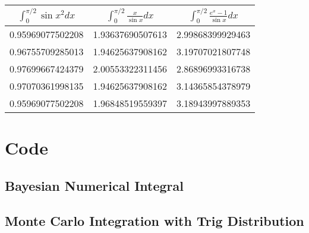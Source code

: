 \documentclass[a4paper12pt,titlepage]{article}
\begin{document}
        \begin{table}[h!]
          \begin{center}
            \label{tab:table1}
            \begin{tabular}{|c|c|c|}
              \toprule
              \large{\textbf{$\int_{0}^{\pi/2} \sin{x^2} dx$}} & \large{\textbf{$\int_{0}^{\pi/2} \frac{x}{\sin{x}} dx$}} & \large{\textbf{$\int_{0}^{\pi/2} \frac{e^x -1}{\sin{x}} dx$}}\\
              \hline
              \normalsize{0.95969077502208} &\normalsize{1.93637690507613} & \normalsize{2.99868399929463}\\
              \hline              
              \normalsize{0.96755709285013} &\normalsize{1.94625637908162} & \normalsize{3.19707021807748}\\
              \hline              
              \normalsize{0.97699667424379} &\normalsize{2.00553322311456} & \normalsize{2.86896993316738}\\
              \hline              
              \normalsize{0.97070361998135} &\normalsize{1.94625637908162} & \normalsize{3.14365854378979}\\
              \hline              
              \normalsize{0.95969077502208} &\normalsize{1.96848519559397} & \normalsize{3.18943997889353}\\
              \hline

            \end{tabular}
          \end{center}
        \end{table}

\clearpage
\section{Code}
    \subsection{Bayesian Numerical Integral}
    
    \clearpage
    \subsection{Monte Carlo Integration with Trig Distribution}
    
\end{document}
